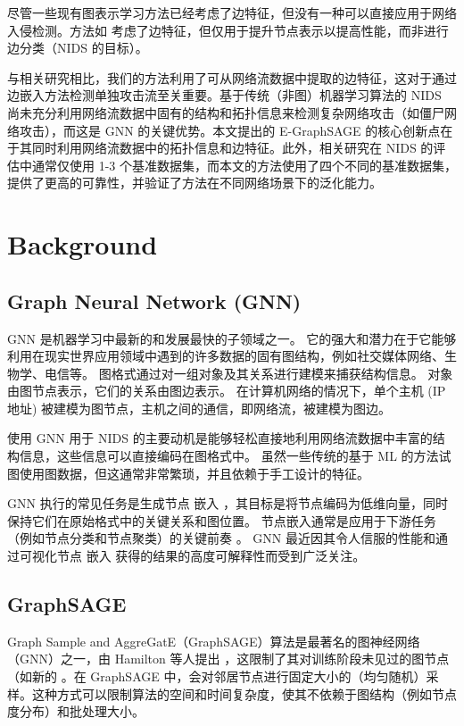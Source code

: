 \documentclass{article}
\begin{document}
尽管一些现有图表示学习方法已经考虑了边特征，但没有一种可以直接应用于网络入侵检测。方法如 \cite{gong2019exploitingedgefeaturesgraph} \cite{gilmer2017neuralmessagepassingquantum} 考虑了边特征，但仅用于提升节点表示以提高性能，而非进行边分类（NIDS 的目标）。

与相关研究相比，我们的方法利用了可从网络流数据中提取的边特征，这对于通过边嵌入方法检测单独攻击流至关重要。基于传统（非图）机器学习算法的 NIDS 尚未充分利用网络流数据中固有的结构和拓扑信息来检测复杂网络攻击（如僵尸网络攻击），而这是 GNN 的关键优势。本文提出的 E-GraphSAGE 的核心创新点在于其同时利用网络流数据中的拓扑信息和边特征。此外，相关研究在 NIDS 的评估中通常仅使用 1-3 个基准数据集，而本文的方法使用了四个不同的基准数据集，提供了更高的可靠性，并验证了方法在不同网络场景下的泛化能力。

\section{Background}

\subsection{Graph Neural Network (GNN)}

GNN 是机器学习中最新的和发展最快的子领域之一。 它的强大和潜力在于它能够利用在现实世界应用领域中遇到的许多数据的固有图结构，例如社交媒体网络、生物学、电信等。 图格式通过对一组对象及其关系进行建模来捕获结构信息。 对象由图节点表示，它们的关系由图边表示。 在计算机网络的情况下，单个主机 (IP 地址) 被建模为图节点，主机之间的通信，即网络流，被建模为图边。

使用 GNN 用于 NIDS 的主要动机是能够轻松直接地利用网络流数据中丰富的结构信息，这些信息可以直接编码在图格式中。 虽然一些传统的基于 ML 的方法试图使用图数据，但这通常非常繁琐，并且依赖于手工设计的特征。

GNN 执行的常见任务是生成节点 嵌入 \cite{cai2018comprehensivesurveygraphembedding}，其目标是将节点编码为低维向量，同时保持它们在原始格式中的关键关系和图位置。 节点嵌入通常是应用于下游任务（例如节点分类和节点聚类）的关键前奏 \cite{cai2018comprehensivesurveygraphembedding}。 GNN 最近因其令人信服的性能和通过可视化节点 嵌入 \cite{zhou2021graphneuralnetworksreview} 获得的结果的高度可解释性而受到广泛关注。

\subsection{GraphSAGE}

Graph Sample and AggreGatE（GraphSAGE）算法是最著名的图神经网络（GNN）之一，由 Hamilton 等人提出 \cite{hamilton2018inductiverepresentationlearninglarge}，这限制了其对训练阶段未见过的图节点（如新的 。在 GraphSAGE 中，会对邻居节点进行固定大小的（均匀随机）采样。这种方式可以限制算法的空间和时间复杂度，使其不依赖于图结构（例如节点度分布）和批处理大小。
\end{document}
